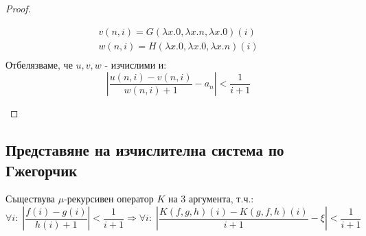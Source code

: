 \begin{proof}
\begin{itemize}
\begin{equation}
\begin{split}
                v(n, i) = G(\lambda x.0, \lambda x.n, \lambda x.0)(i) \\
                w(n, i) = H(\lambda x.0, \lambda x.0, \lambda x.n)(i) \\
            \end{split}
        \end{equation}
        Отбелязваме, че $u, v, w$ - изчислими и:
        \begin{equation}
            \left|\frac{u(n, i) - v(n, i)}{w(n,i) + 1} - a_n\right| < \frac{1}{i+1}
        \end{equation}
    \end{itemize}
\end{proof}

\subsection{Представяне на изчислителна система по Гжегорчик}
\begin{lemma}
    Съществува $\mu$-рекурсивен оператор $K$ на 3 аргумента, т.ч.:
    \begin{equation}
        \forall i:\; \left|\frac{f(i) - g(i)}{h(i) + 1}\right| < \frac{1}{i+1} \Rightarrow \forall i:\; \left|\frac{K(f, g, h)(i) - K(g, f, h)(i)}{i + 1} - \xi\right| < \frac{1}{i+1}
    \end{equation}
\end{lemma}
